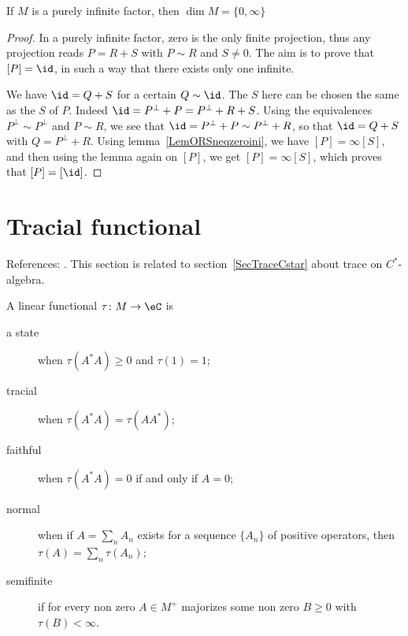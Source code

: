 \begin{corollary}
If $M$ is a purely infinite factor, then $\dim M=\{ 0,\infty \}$
\end{corollary}

\begin{proof}
In a purely infinite factor, zero is the only finite projection, thus any projection reads $P=R+S$ with $P\sim R$ and $S\neq 0$. The aim is to prove that $[P]=\id$, in such a way that there exists only one infinite.

We have $\id=Q+S$ for a certain $Q\sim \id$. The $S$ here can be chosen the same as the $S$ of $P$. Indeed $\id=P^{\perp}+P=P^{\perp}+R+S$. Using the equivalences $P^{\perp}\sim P^{\perp}$ and $P\sim R$, we see that $\id=P^{\perp}+P\sim P^{\perp}+R$, so that $\id=Q+S$ with $Q=P^{\perp}+R$. Using lemma~\ref{LemORSneqzeroini}, we have $[P]=\infty[S]$, and then using the lemma again on $[P]$, we get $[P]=\infty[S]$, which proves that $[P]=[\id]$.
\end{proof}

					\section{Tracial functional}
\label{SecTracevonNeuman}

References: \cite{DixmierTrace,TrioloSemifinite}. This section is related to section~\ref{SecTraceCstar} about trace on $C^*$-algebra.

A linear functional $\tau\colon M\to \eC$ is
\begin{description}
	\item[a state] when $\tau(A^*A)\geq0$ and $\tau(1)=1$;
	\item[tracial] when $\tau(A^*A)=\tau(AA^*)$;
	\item[faithful] when $\tau(A^*A)=0$ if and only if $A=0$;
	\item[normal] when if $A=\sum_n A_n$ exists for a sequence $\{ A_n \}$ of positive operators, then $\tau(A)=\sum_n\tau(A_n)$;
	\item[semifinite] if for every non zero $A\in M^+$ majorizes some non zero $B\geq 0$ with $\tau(B)<\infty$.
\end{description}

